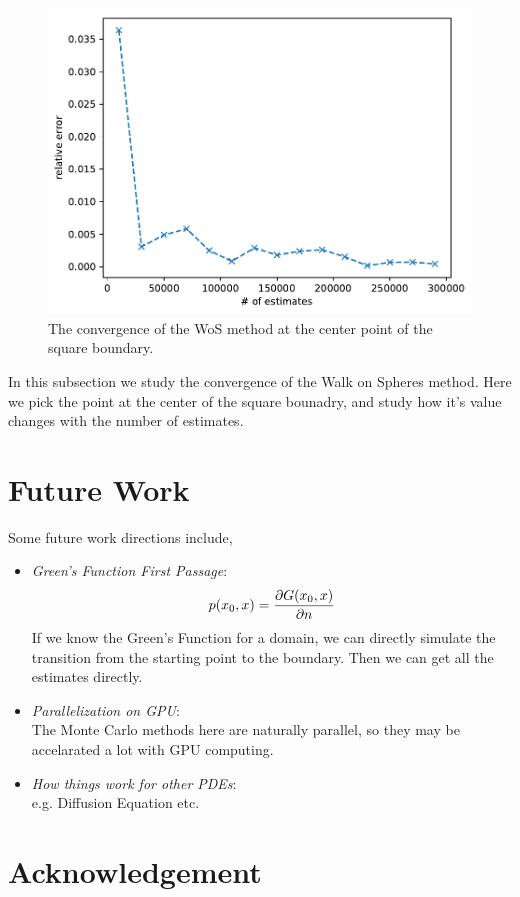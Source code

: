 \documentclass[aps, prl, preprint, groupedaddress]{revtex4-1}
\begin{document}
\begin{figure}[htbp]
    \centering
    \includegraphics[width=.8\textwidth]{./figs/err_es}
    \caption{\label{fig:err_es} The convergence of the WoS method at the center point of the square boundary.}
\end{figure}

In this subsection we study the convergence of the Walk on Spheres method. Here we pick the point at the center of the square bounadry, and study how it's value changes with the number of estimates.

\section{Future Work}

Some future work directions include,
\begin{itemize}
    \item \emph{Green's Function First Passage}:
    \begin{equation*}
        p(x_0, x) = \pdv{G(x_0, x)}{n}
    \end{equation*}
    If we know the Green's Function for a domain, we can directly simulate the transition from the starting point to the boundary. Then we can get all the estimates directly.
    \item \emph{Parallelization on GPU}:\\
    The Monte Carlo methods here are naturally parallel, so they may be accelarated a lot with GPU computing.
    \item \emph{How things work for other PDEs}:\\
    e.g. Diffusion Equation etc.
\end{itemize}

\section{Acknowledgement}
\end{document}
